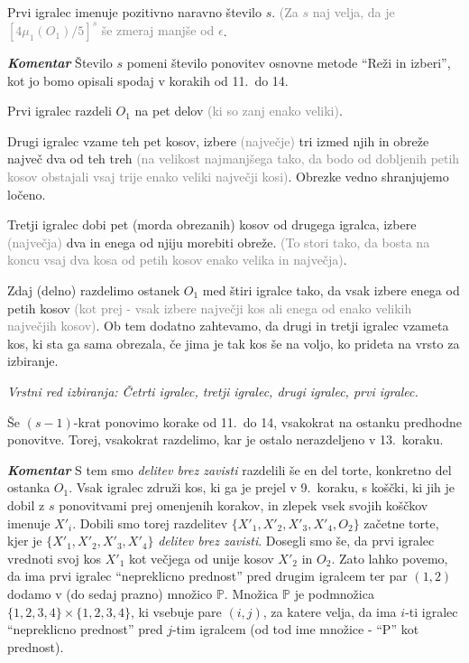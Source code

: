 \documentclass[a4paper,12pt]{article}
\def\P{\mathbb{P}}
\begin{document}
\begin{protokol}
\item Prvi igralec imenuje pozitivno naravno število $s$. \textcolor{gray}{(Za $s$ naj velja, da je $[4\mu_1(O_1)/5]^s$ še zmeraj manjše od $\epsilon$}. 

\item [\textbf{\em Komentar}] Število $s$ pomeni število ponovitev osnovne metode ``Reži in izberi'', kot jo bomo opisali spodaj v korakih od 11.~do 14.


\item Prvi igralec razdeli $O_1$ na pet delov \textcolor{gray}{(ki so zanj enako veliki)}.

\item Drugi igralec vzame teh pet kosov, izbere \textcolor{gray}{(največje)} tri izmed njih in obreže največ dva od teh treh \textcolor{gray}{(na velikost najmanjšega tako, da bodo od dobljenih petih kosov obstajali vsaj trije enako veliki največji kosi)}. Obrezke vedno shranjujemo ločeno.

\item Tretji igralec dobi pet (morda obrezanih) kosov od drugega igralca, izbere \textcolor{gray}{(največja)} dva in enega od njiju morebiti obreže. \textcolor{gray}{(To stori tako, da bosta na koncu vsaj dva kosa od petih kosov enako velika in največja)}.

\item Zdaj (delno) razdelimo ostanek $O_1$ med štiri igralce tako, da vsak izbere enega od petih kosov \textcolor{gray}{(kot prej - vsak izbere največji kos ali enega od enako velikih največjih kosov)}. Ob tem dodatno zahtevamo, da drugi in tretji igralec vzameta kos, ki sta ga sama obrezala, če jima je tak kos še na voljo, ko prideta na vrsto za izbiranje.

\textsl{Vrstni red izbiranja: Četrti igralec, tretji igralec, drugi igralec, prvi igralec.}

\item Še $(s - 1)$-krat ponovimo korake od 11.~do 14, vsakokrat na ostanku predhodne ponovitve. Torej, vsakokrat razdelimo, kar je ostalo nerazdeljeno v 13.~koraku.

\item [\textbf{\em Komentar}]  S tem smo {\em delitev brez zavisti} razdelili še en del torte, konkretno del ostanka $O_1$. Vsak igralec združi kos, ki ga je prejel v 9.~koraku, s koščki, ki jih je dobil z $s$ ponovitvami prej omenjenih korakov, in zlepek vsek svojih koščkov imenuje $X'_i$. Dobili smo torej razdelitev ${\{X'_1, X'_2, X'_3, X'_4, O_2\}}$ začetne torte, kjer je ${\{X'_1, X'_2, X'_3, X'_4\}}$ {\em delitev brez zavisti}. Dosegli smo še, da prvi igralec vrednoti svoj kos $X'_1$ kot večjega od unije kosov $X'_2$ in $O_2$. Zato lahko povemo, da ima prvi igralec ``nepreklicno prednost'' pred drugim igralcem ter par $(1,2)$ dodamo v (do sedaj prazno) množico $\P$. Množica $\P$ je podmnožica ${\{1, 2, 3, 4\}} \times {\{1, 2, 3, 4\}}$, ki vsebuje pare $(i, j)$, za katere velja, da ima $i$-ti igralec ``nepreklicno prednost'' pred $j$-tim igralcem (od tod ime množice - ``P'' kot prednost).


\end{protokol}
\end{document}
